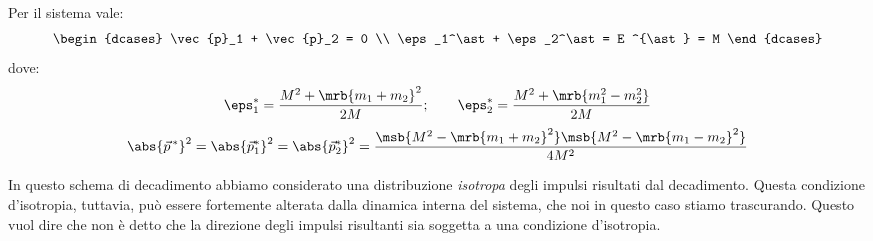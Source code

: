 Per il sistema vale:
\begin{equation}
	\begin{dcases}
		\vec{p}_1 + \vec{p}_2 = 0
		\\
		\eps_1^\ast + \eps_2^\ast = E ^{\ast} = M
	\end{dcases}
\end{equation}
dove:
\begin{equation}
	\eps_1^\ast = \frac{M^2 + \mrb{m_1 + m_2}^2}{2M};
	\qquad
	\eps_2^\ast = \frac{M^2 + \mrb{m_1^2 - m_2^2}}{2M}
\end{equation}
\begin{equation}
	\abs{\vec{p}^{\,\ast}}^2
	= \abs{\vec{p}_{1}^{\ast}}^{2}
	= \abs{\vec{p}_{2}^{\ast}}^{2}
	= \frac{\msb{M^2 - \mrb{m_1 + m_2}^2} \msb{M^2 -
			\mrb{m_1 - m_2}^2}}{4M^2}
	\label{eq:modulo_quadro_impulso}
\end{equation}

\begin{note}[]
	In questo schema di decadimento abbiamo considerato una distribuzione
	\textit{isotropa} degli impulsi risultati dal decadimento. Questa condizione
	d'isotropia, tuttavia, può essere fortemente alterata dalla dinamica interna
	del sistema, che noi in questo caso stiamo trascurando. Questo vuol dire che
	non è detto che la direzione degli impulsi risultanti sia soggetta a una
	condizione d'isotropia.
\end{note}

